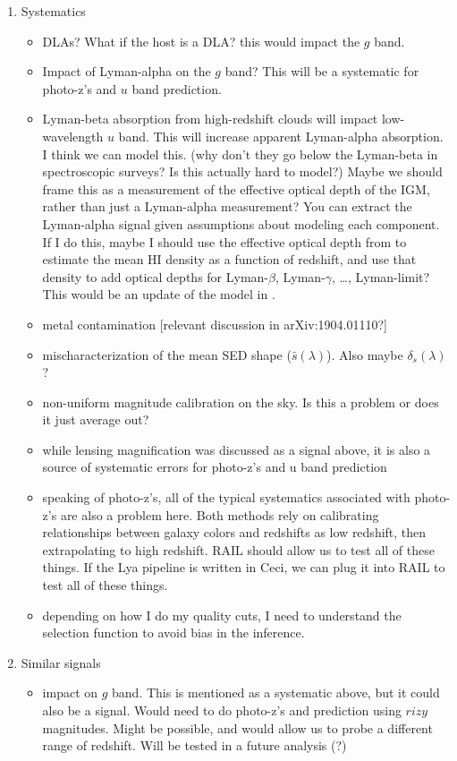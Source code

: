 \documentclass[twocolumn]{aastex631}
\begin{document}
\begin{enumerate}
    \item Systematics
    \begin{itemize}
        \item DLAs? What if the host is a DLA? this would impact the $g$ band.
        \item Impact of Lyman-alpha on the $g$ band? This will be a systematic for photo-z's and $u$ band prediction.
        \item Lyman-beta absorption from high-redshift clouds will impact low-wavelength $u$ band. This will increase apparent Lyman-alpha absorption. I think we can model this. (why don't they go below the Lyman-beta in spectroscopic surveys? Is this actually hard to model?) Maybe we should frame this as a measurement of the effective optical depth of the IGM, rather than just a Lyman-alpha measurement? You can extract the Lyman-alpha signal given assumptions about modeling each component. If I do this, maybe I should use the effective optical depth from \citep{kamble2020} to estimate the mean HI density as a function of redshift, and use that density to add optical depths for Lyman-$\beta$, Lyman-$\gamma$, \dots, Lyman-limit? This would be an update of the model in \citep{madau1995}.
        \item metal contamination [relevant discussion in arXiv:1904.01110?]
        \item mischaracterization of the mean SED shape ($\bar{s}(\lambda)$). Also maybe $\delta_s(\lambda)$?
        \item non-uniform magnitude calibration on the sky. Is this a problem or does it just average out?
        \item while lensing magnification was discussed as a signal above, it is also a source of systematic errors for photo-z's and u band prediction
        \item speaking of photo-z's, all of the typical systematics associated with photo-z's are also a problem here. Both methods rely on calibrating relationships between galaxy colors and redshifts as low redshift, then extrapolating to high redshift. RAIL should allow us to test all of these things. If the Lya pipeline is written in Ceci, we can plug it into RAIL to test all of these things.
        \item depending on how I do my quality cuts, I need to understand the selection function to avoid bias in the inference.
    \end{itemize}
    
    \item Similar signals
    \begin{itemize}
        \item impact on $g$ band. This is mentioned as a systematic above, but it could also be a signal. Would need to do photo-z's and prediction using $rizy$ magnitudes. Might be possible, and would allow us to probe a different range of redshift. Will be tested in a future analysis (?)
    \end{itemize}
    

\end{enumerate}
\end{document}
